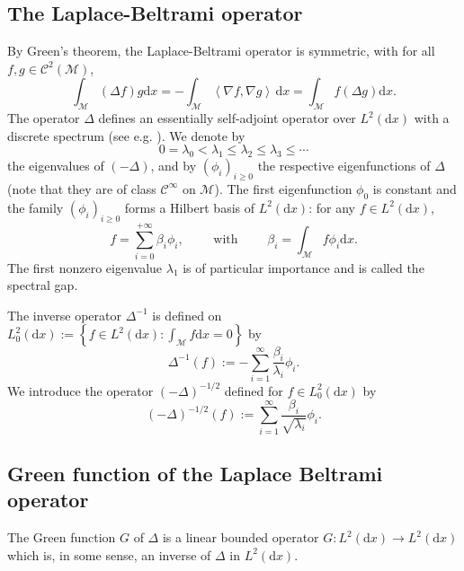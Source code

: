 \documentclass[10pt,a4paper]{article}
\newcommand\dif{\mathrm{ d}}
\newcommand\cC{\mathcal{C}}
\newcommand\cM{\mathcal{M}}
\newcommand\dd{\mathrm{d}}
\newcommand{\BRA}[1]{{{\left\{#1\right\}}}} %
\newcommand{\SCA}[1]{{{\left\langle #1\right\rangle}}} %
\newcommand{\PAR}[1]{{{\left(#1\right)}}} %
\begin{document}
\subsection{ The Laplace-Beltrami operator}\label{sec:weighted-laplacian}


By Green's theorem, the Laplace-Beltrami operator is symmetric, with for all $f,g\in \cC^2(\cM)$,
\begin{equation}\label{eq:green-thm}
 \int_{\cM} (\Delta f)g \dif x =-\int_{\cM} \SCA{ \nabla f , \nabla g }  \, \dd x=  \int_{\cM} f(\Delta g) \dif x. 
 \end{equation}
The  operator $\Delta$ defines an essentially self-adjoint operator over $L^2(\dd x)$ with a discrete spectrum (see e.g.  \cite[Chapter I, Section 3]{Chavel1984}).  
We denote by
 \[
 0 = \lambda_0 < \lambda_1 \le \lambda_2 \le \lambda_3 \le \cdots
 \]
 the eigenvalues of $(-\Delta)$, and by $(\phi_i)_{i\ge 0}$ the respective eigenfunctions  of $\Delta$ (note that they are of class $\cC^{\infty}$ on $\cM$). The first eigenfunction $\phi_0$ is constant and the family $(\phi_i)_{i\ge 0}$ forms a Hilbert basis of $L^2(\dd x)$: for any $f\in L^2(\dd x)$,
 \[
 f=\sum_{i=0}^{+\infty}\beta_i \phi_i,\qquad \mbox{ with }\qquad \beta_i=\int_\cM f\phi_i\dd x.
 \]
The first nonzero eigenvalue $\lambda_1$ is of particular importance and is called the spectral gap.


 The inverse operator $\Delta^{-1}$ is defined on $L^2_0(\dd x):=\BRA{f\in L^2(\dd x): \int_\cM f\dd x=0}$ by 
 \begin{equation}
 \Delta^{-1}(f):=-\sum_{i=1}^\infty\frac{\beta_i}{\lambda_i}\phi_i.
\end{equation}
We introduce the operator $\PAR{-\Delta}^{-1/2}$ 
defined   for $f\in L_0^2(\dd x)$ by
\[
\PAR{-\Delta}^{-1/2}(f):=\sum_{i=1}^\infty\frac{\beta_i}{\sqrt{\lambda_i}}\phi_i.
\]


\subsection{Green function of the Laplace Beltrami operator}\label{sec:green}

The Green function $G$ of $\Delta$ is a linear bounded operator $G:L^2(\dd x)\to L^2(\dd x)$ which is, in some sense, an inverse of $\Delta$ in $L^2(\dd x)$.
\end{document}
